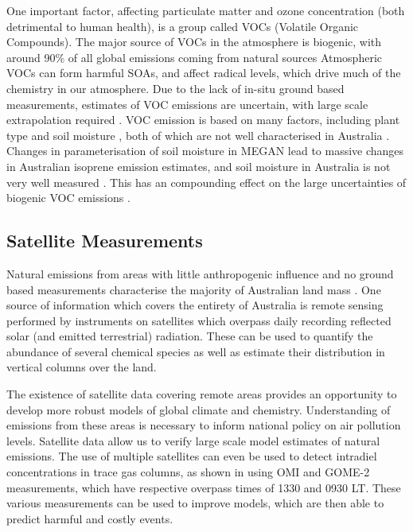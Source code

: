     
    One important factor, affecting particulate matter and ozone concentration (both detrimental to human health), is a group called VOCs (Volatile Organic Compounds).
    The major source of VOCs in the atmosphere is biogenic, with around 90\% of all global emissions coming from natural sources \citep{Guenther1995,Guenther2006, Millet2006}
    Atmospheric VOCs can form harmful SOAs, and affect radical levels, which drive much of the chemistry in our atmosphere.
    Due to the lack of in-situ ground based measurements, estimates of VOC emissions are uncertain, with large scale extrapolation required \citet{Millet2006}.
    VOC emission is based on many factors, including plant type and soil moisture \citep{Guenther1995}, both of which are not well characterised in Australia \citep{Sindelarova2014, Bauwens2016}.
    Changes in parameterisation of soil moisture in MEGAN lead to massive changes in Australian isoprene emission estimates, and soil moisture in Australia is not very well measured \citep{Sindelarova2014}.
    This has an compounding effect on the large uncertainties of biogenic VOC emissions \citep{Guenther2000, Millet2006}.

  \subsection{Satellite Measurements}

    Natural emissions from areas with little anthropogenic influence and no ground based measurements characterise the majority of Australian land mass \citep{VanDerA2008}.
    One source of information which covers the entirety of Australia is remote sensing performed by instruments on satellites which overpass daily recording reflected solar (and emitted terrestrial) radiation.
    These can be used to quantify the abundance of several chemical species as well as estimate their distribution in vertical columns over the land.

    The existence of satellite data covering remote areas provides an opportunity to develop more robust models of global climate and chemistry.
    Understanding of emissions from these areas is necessary to inform national policy on air pollution levels.
    Satellite data allow us to verify large scale model estimates of natural emissions.
    The use of multiple satellites can even be used to detect intradiel concentrations in trace gas columns, as shown in \cite{Stavrakou2015} using OMI and GOME-2 measurements, which have respective overpass times of 1330 and 0930 LT.
    These various measurements can be used to improve models, which are then able to predict harmful and costly events.
    
